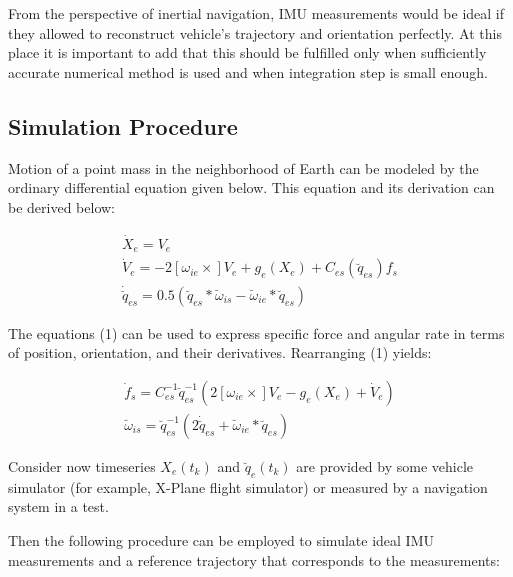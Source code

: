 \documentclass[conference]{IEEEtran}
\begin{document}
From the perspective of inertial navigation, IMU measurements would be ideal if they allowed to reconstruct vehicle’s trajectory and orientation perfectly. At this place it is important to add that this should be fulfilled only when sufficiently accurate numerical method is used and when integration step is small enough.

\subsection{Simulation Procedure}
Motion of a point mass in the neighborhood of Earth can be modeled by the ordinary differential equation given below. This equation and its derivation can be derived below:

\begin{equation}
\begin{array}{l}  
\dot X_{e} = V_{e} \\
\dot V_{e} = -2[\omega_{ie} \times]V_{e}+g_{e}(X_{e})+C_{es}(\breve q_{es})f_{s} \\
\dot{\breve{q}}_{es}  = 0.5(\breve q_{es}*\breve \omega_{is}-\breve \omega_{ie}*\breve q_{es})
\end{array} 
\end{equation}

The equations (1) can be used to express specific force and angular rate in terms of position, orientation, and their derivatives. Rearranging (1) yields:

\begin{equation}
\begin{array}{l}
\dot f_{s} = C_{es}^{-1}\breve q_{es}^{-1}(2[\omega_{ie} \times]V_{e}-g_{e}(X_{e})+\dot V_{e}) \\
\breve \omega_{is} = \breve q_{es}^{-1}(2\dot{\breve{q}}_{es}+\breve\omega_{ie}*\breve q_{es})
\end{array} 
\end{equation}


Consider now timeseries $X_{e}(t_{k})$ and $\breve q_{e}(t_{k})$ are provided by some vehicle simulator (for example, X-Plane flight simulator) or measured by a navigation system in a test.

Then the following procedure can be employed to simulate ideal IMU measurements and a reference trajectory that corresponds to the measurements:
\end{document}
